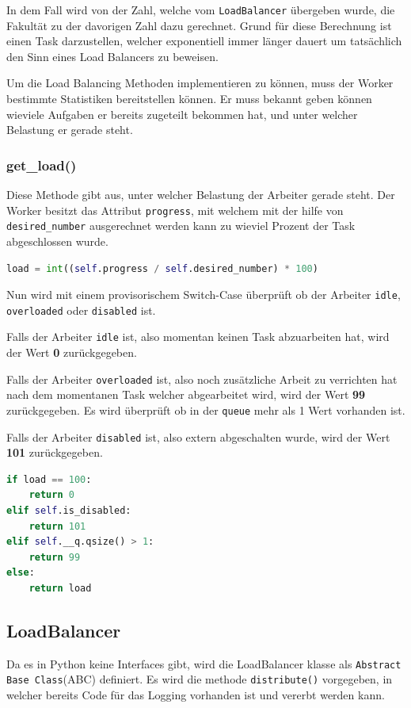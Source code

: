 In dem Fall wird von der Zahl, welche vom \verb|LoadBalancer| übergeben wurde, die Fakultät zu der davorigen Zahl dazu gerechnet. Grund für diese Berechnung ist einen Task darzustellen, welcher exponentiell immer länger dauert um tatsächlich den Sinn eines Load Balancers zu beweisen.

Um die Load Balancing Methoden implementieren zu können, muss der Worker bestimmte Statistiken bereitstellen können. Er muss bekannt geben können wieviele Aufgaben er bereits zugeteilt bekommen hat, und unter welcher Belastung er gerade steht. 

\subsubsection{get\_load()}
Diese Methode gibt aus, unter welcher Belastung der Arbeiter gerade steht. Der Worker besitzt das Attribut \verb|progress|, mit welchem mit der hilfe von \verb|desired_number| ausgerechnet werden kann zu wieviel Prozent der Task abgeschlossen wurde.

\begin{lstlisting}[language=python]
load = int((self.progress / self.desired_number) * 100)
\end{lstlisting}

Nun wird mit einem provisorischem Switch-Case überprüft ob der Arbeiter \verb|idle|, \verb|overloaded| oder \verb|disabled| ist. 

Falls der Arbeiter \verb|idle| ist, also momentan keinen Task abzuarbeiten hat, wird der Wert \textbf{0} zurückgegeben.

Falls der Arbeiter \verb|overloaded| ist, also noch zusätzliche Arbeit zu verrichten hat nach dem momentanen Task welcher abgearbeitet wird, wird der Wert \textbf{99} zurückgegeben. Es wird überprüft ob in der \verb|queue| mehr als 1 Wert vorhanden ist.

Falls der Arbeiter \verb|disabled| ist, also extern abgeschalten wurde, wird der Wert \textbf{101} zurückgegeben.


\begin{lstlisting}[language=python]
if load == 100:
	return 0
elif self.is_disabled:
	return 101
elif self.__q.qsize() > 1:
	return 99
else:
	return load
\end{lstlisting}
\subsection{LoadBalancer}
Da es in Python keine Interfaces gibt, wird die LoadBalancer klasse als \verb|Abstract Base Class|(ABC) definiert. Es wird die methode \verb|distribute()| vorgegeben, in welcher bereits Code für das Logging vorhanden ist und vererbt werden kann.

